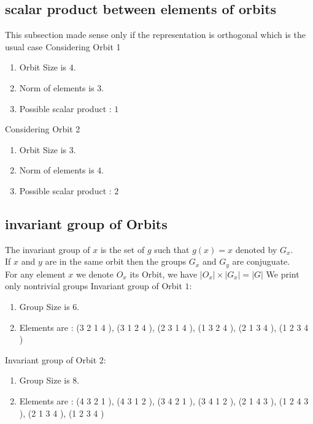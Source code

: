 \documentclass[12pt]{article}
\begin{document}
\subsection{scalar product between elements of orbits}
\noindent This subsection made sense only if the representation is orthogonal which is the usual case
Considering Orbit 1
\begin{enumerate}
\item Orbit Size is $4$.
\item Norm of elements is $3$.
\item Possible scalar product : $1$
\end{enumerate}
Considering Orbit 2
\begin{enumerate}
\item Orbit Size is $3$.
\item Norm of elements is $4$.
\item Possible scalar product : $2$
\end{enumerate}
\subsection{invariant group of Orbits}
\noindent The invariant group of $x$ is the set of $g$ such that $g(x)=x$ denoted by $G_x$.\\
If $x$ and $y$ are in the same orbit then the groups $G_x$ and  $G_y$ are conjuguate.\\
For any element $x$ we denote $O_x$ its Orbit, we have $|O_x|\times |G_x|=|G|$
We print only nontrivial groups
Invariant group of Orbit $1$:
\begin{enumerate}
\item Group Size is $6$.
\item Elements are : (3 2 1 4  ), (3 1 2 4  ), (2 3 1 4  ), (1 3 2 4  ), (2 1 3 4  ), (1 2 3 4  )
\end{enumerate}
Invariant group of Orbit $2$:
\begin{enumerate}
\item Group Size is $8$.
\item Elements are : (4 3 2 1  ), (4 3 1 2  ), (3 4 2 1  ), (3 4 1 2  ), (2 1 4 3  ), (1 2 4 3  ), (2 1 3 4  ), (1 2 3 4  )
\end{enumerate}
\end{document}
